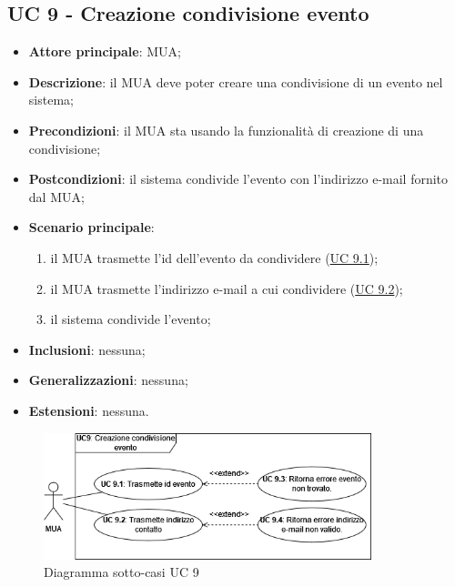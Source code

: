 \subsection{UC 9 - Creazione condivisione evento} \label{sec:UC9}

    \begin{itemize}
        \item \textbf{Attore principale}: MUA;
        \item \textbf{Descrizione}: il MUA deve poter creare una condivisione di un evento nel sistema;
        \item \textbf{Precondizioni}: il MUA sta usando la funzionalità di creazione di una condivisione;
        \item \textbf{Postcondizioni}: il sistema condivide l'evento con l'indirizzo e-mail fornito dal MUA;
        \item \textbf{Scenario principale}:
            \begin{enumerate}
                \item il MUA trasmette l'id dell'evento da condividere (\hyperref[sec:UC9.1]{UC 9.1});
                \item il MUA trasmette l'indirizzo e-mail a cui condividere (\hyperref[sec:UC9.2]{UC 9.2});
                \item il sistema condivide l'evento;
            \end{enumerate}
        \item \textbf{Inclusioni}: nessuna;
        \item \textbf{Generalizzazioni}: nessuna;
        \item \textbf{Estensioni}: nessuna.
    \end{itemize}

    \begin{figure}[H]
        \includegraphics[width=0.85\textwidth]{sections/uc_imgs/UC09.png}
        \centering
        \caption{Diagramma sotto-casi UC 9}
    \end{figure}

